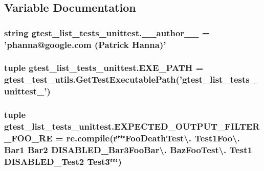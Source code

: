 \subsection{Variable Documentation}
\hypertarget{namespacegtest__list__tests__unittest_a713be99fff40e5e280886232fa2f35ff}{
\subsubsection[{\-\_\-\-\_\-author\-\_\-\-\_\-}]{\setlength{\rightskip}{0pt plus 5cm}string gtest\-\_\-list\-\_\-tests\-\_\-unittest.\-\_\-\-\_\-author\-\_\-\-\_\- = 'phanna@google.\-com (Patrick Hanna)'}}\label{namespacegtest__list__tests__unittest_a713be99fff40e5e280886232fa2f35ff}
\hypertarget{namespacegtest__list__tests__unittest_afb67ca7674b402c226255d27f9147409}{
\subsubsection[{E\-X\-E\-\_\-\-P\-A\-T\-H}]{\setlength{\rightskip}{0pt plus 5cm}tuple gtest\-\_\-list\-\_\-tests\-\_\-unittest.\-E\-X\-E\-\_\-\-P\-A\-T\-H = {\bf gtest\-\_\-test\-\_\-utils.\-Get\-Test\-Executable\-Path}('gtest\-\_\-list\-\_\-tests\-\_\-unittest\-\_\-')}}\label{namespacegtest__list__tests__unittest_afb67ca7674b402c226255d27f9147409}
\hypertarget{namespacegtest__list__tests__unittest_a7677a2612a3c6a6ef3fcca86c96a2e99}{
\subsubsection[{E\-X\-P\-E\-C\-T\-E\-D\-\_\-\-O\-U\-T\-P\-U\-T\-\_\-\-F\-I\-L\-T\-E\-R\-\_\-\-F\-O\-O\-\_\-\-R\-E}]{\setlength{\rightskip}{0pt plus 5cm}tuple gtest\-\_\-list\-\_\-tests\-\_\-unittest.\-E\-X\-P\-E\-C\-T\-E\-D\-\_\-\-O\-U\-T\-P\-U\-T\-\_\-\-F\-I\-L\-T\-E\-R\-\_\-\-F\-O\-O\-\_\-\-R\-E = re.\-compile(r\char`\"{}\char`\"{}\char`\"{}Foo\-Death\-Test\textbackslash{}. Test1\-Foo\textbackslash{}. Bar1 Bar2 D\-I\-S\-A\-B\-L\-E\-D\-\_\-\-Bar3\-Foo\-Bar\textbackslash{}. Baz\-Foo\-Test\textbackslash{}. Test1 D\-I\-S\-A\-B\-L\-E\-D\-\_\-\-Test2 Test3\char`\"{}\char`\"{}\char`\"{})}}\label{namespacegtest__list__tests__unittest_a7677a2612a3c6a6ef3fcca86c96a2e99}
